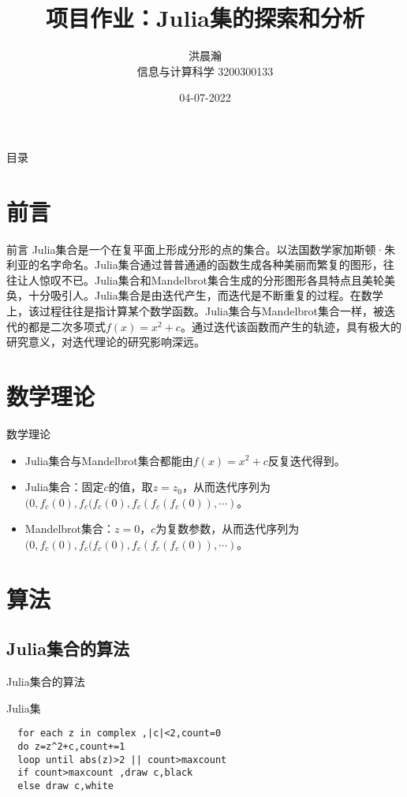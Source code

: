 \documentclass{beamer}
\begin{document}
\title{项目作业：Julia集的探索和分析}
\author{洪晨瀚 \\ 信息与计算科学 3200300133} 
\date{04-07-2022}
\frame{\titlepage}


\begin{frame}{目录}
  \tableofcontents
\end{frame}

\section{前言}
\begin{frame}{前言}
  Julia集合是一个在复平面上形成分形的点的集合。以法国数学家加斯顿·朱利亚的名字命名。Julia集合通过普普通通的函数生成各种美丽而繁复的图形，往往让人惊叹不已。Julia集合和Mandelbrot集合生成的分形图形各具特点且美轮美奂，十分吸引人。Julia集合是由迭代产生，而迭代是不断重复的过程。在数学上，该过程往往是指计算某个数学函数。Julia集合与Mandelbrot集合一样，被迭代的都是二次多项式$f(x)=x^2+c$。通过迭代该函数而产生的轨迹，具有极大的研究意义，对迭代理论的研究影响深远。 

\end{frame}

\section{数学理论}
\begin{frame}{数学理论}
  \begin{itemize}
  \item Julia集合与Mandelbrot集合都能由$f(x)=x^2+c$反复迭代得到。
  \item Julia集合：固定$c$的值，取$z=z_0$，从而迭代序列为$(0,f_c(0),f_c(f_c(0),f_c(f_c(f_c(0)),\cdots)$。
  \item Mandelbrot集合：$z=0$，$c$为复数参数，从而迭代序列为$(0,f_c(0),f_c(f_c(0),f_c(f_c(f_c(0)),\cdots)$。
  \end{itemize}
\end{frame}  

\section{算法}
\subsection{Julia集合的算法}
\begin{frame}[fragile]{Julia集合的算法}
  \begin{block}{Julia集}
\begin{verbatim}
  for each z in complex ,|c|<2,count=0
  do z=z^2+c,count+=1
  loop until abs(z)>2 || count>maxcount
  if count>maxcount ,draw c,black
  else draw c,white
\end{verbatim}
  \end{block}
\end{frame}
\end{document}
